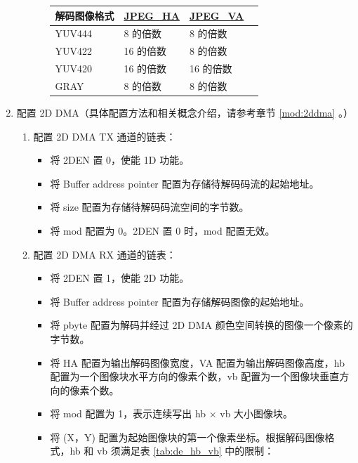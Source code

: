 \documentclass[main\_\_CN.tex]{subfiles}
\begin{document}
\begin{enumerate}
\begin{itemize}
\begin{itemize}
\begin{longtable}{ | L{4cm} | L{4cm} | l | l |}
                \\ \hline
                \textbf{解码图像格式} & \textbf{\hyperref[fielddesc:JPEGHA]{JPEG\_HA}} & \textbf{\hyperref[fielddesc:JPEGVA]{JPEG\_VA}}\\ \hline
                YUV444 & 8 的倍数 & 8 的倍数 \\ \hline
                YUV422 & 16 的倍数 & 8 的倍数 \\ \hline
                YUV420 & 16 的倍数 & 16 的倍数 \\ \hline
                GRAY & 8 的倍数 & 8 的倍数 \\ \hline
            \end{longtable}
        \end{itemize}
    \end{itemize}
    \item 配置 2D DMA（具体配置方法和相关概念介绍，请参考章节 \ref{mod:2ddma}
    \textit{}。）
    \begin{enumerate}
        \item 配置 2D DMA TX 通道的链表：
        \begin{itemize}
            \item 将 2DEN 置 0，使能 1D 功能。
            \item 将 Buffer address pointer 配置为存储待解码码流的起始地址。
            \item 将 size 配置为存储待解码码流空间的字节数。
            \item 将 mod 配置为 0。2DEN 置 0 时，mod 配置无效。
        \end{itemize}
        \item 配置 2D DMA RX 通道的链表：
        \begin{itemize}
            \item 将 2DEN 置 1，使能 2D 功能。
            \item 将 Buffer address pointer 配置为存储解码图像的起始地址。
            \item 将 pbyte 配置为解码并经过 2D DMA 颜色空间转换的图像一个像素的字节数。
            \item 将 HA 配置为输出解码图像宽度，VA 配置为输出解码图像高度，hb 配置为一个图像块水平方向的像素个数，vb 配置为一个图像块垂直方向的像素个数。
            \item 将 mod 配置为 1，表示连续写出 hb × vb 大小图像块。
            \item 将 (X，Y) 配置为起始图像块的第一个像素坐标。根据解码图像格式，hb 和 vb 须满足表 \ref{tab:de_hb_vb} \textit{} 中的限制：

\end{itemize}
\end{enumerate}
\end{enumerate}
\end{document}
